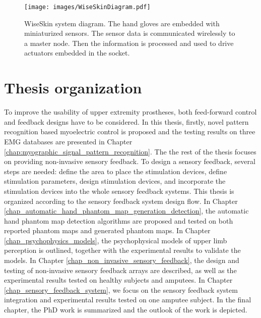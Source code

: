  \begin{figure}[hbt!]
    \centering
        \texttt{[image: images/WiseSkinDiagram.pdf]}
        \caption{WiseSkin system diagram. The hand gloves are embedded with miniaturized sensors. The sensor data is communicated wirelessly to a master node. Then the information is processed and used to drive actuators embedded in the socket.  }
        \label{fig:wiseskin_system_diagram}
\end{figure}




\section{Thesis organization}
To improve the usability of upper extremity prostheses, both feed-forward control and feedback designs have to be considered. In this thesis, firstly, novel pattern recognition based myoelectric control is proposed and the testing results on three EMG databases are presented in Chapter \ref{chap:myographic_signal_pattern_recognition}. 
The the rest of the thesis focuses on providing non-invasive sensory feedback.
To design a sensory feedback, several steps are needed: define the area to place the stimulation devices, define stimulation parameters, design stimulation devices, and incorporate the stimulation devices into the whole sensory feedback systems. This thesis is organized according to the sensory feedback system design flow.
In Chapter \ref{chap_automatic_hand_phantom_map_generation_detection},  the automatic hand phantom map detection algorithms are proposed and tested on both reported phantom maps and generated phantom maps.
In Chapter \ref{chap_psychophysics_models}, the psychophysical models of upper limb perception is outlined, together with the experimental results to validate the models.
In Chapter \ref{chap_non_invasive_sensory_feedback}, the design and testing of non-invasive sensory feedback arrays are described, as well as the experimental results tested on healthy subjects and amputees.
In Chapter \ref{chap_sensory_feedback_system}, we focus on the sensory feedback system integration and experimental results tested on one amputee subject. 
In the final chapter, the PhD work is summarized and the outlook of the work is depicted.



